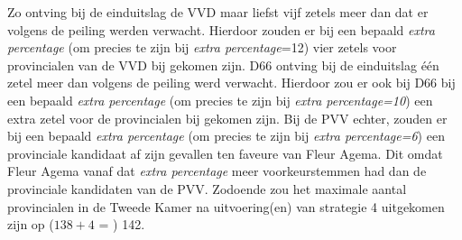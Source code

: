 Zo ontving bij de einduitslag de VVD maar liefst vijf zetels meer dan dat er volgens de peiling werden verwacht. Hierdoor zouden er bij een bepaald \textit{extra percentage} (om precies te zijn bij \textit{extra percentage}=12) vier zetels voor provincialen van de VVD bij gekomen zijn. D66 ontving bij de einduitslag één zetel meer dan volgens de peiling werd verwacht. Hierdoor zou er ook bij D66 bij een bepaald \textit{extra percentage} (om precies te zijn bij \textit{extra percentage=10}) een extra zetel voor de provincialen bij gekomen zijn. Bij de PVV echter, zouden er bij een bepaald \textit{extra percentage} (om precies te zijn bij \textit{extra percentage=6}) een provinciale kandidaat af zijn gevallen ten faveure van Fleur Agema. Dit omdat Fleur Agema vanaf dat \textit{extra percentage} meer voorkeurstemmen had dan de provinciale kandidaten van de PVV. Zodoende zou het maximale aantal provincialen in de Tweede Kamer na uitvoering(en) van strategie 4 uitgekomen zijn op ($138+4$ = ) 142.



